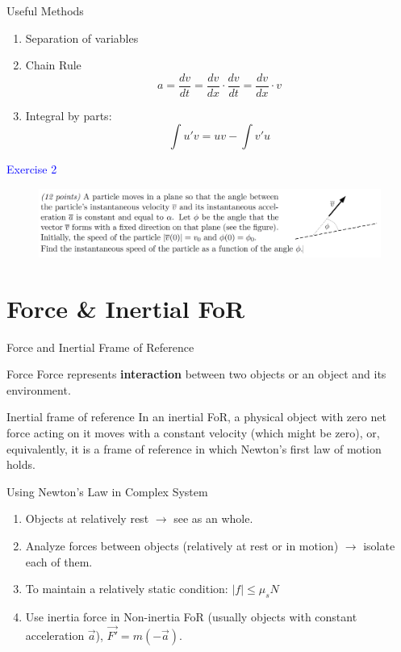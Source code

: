 \documentclass{beamer}
\begin{document}
\begin{frame}{Useful Methods}
  \begin{enumerate}
    \item Separation of variables\pause
    \item Chain Rule
    $$a = \frac{dv}{dt}=\frac{dv}{dx}\cdot \frac{dv}{dt}=\frac{dv}{dx}\cdot v$$\pause
    \item Integral by parts:
    $$\int u'v = uv - \int v'u$$
  \end{enumerate}
\end{frame}
\begin{frame}
\textcolor{blue}{Exercise 2}

\begin{figure}[htbp]
\centering
\includegraphics[width=1 \linewidth, angle =0]{ex1.png}
\label{fig:2}
\end{figure}
\end{frame}

\section{Force \& Inertial FoR}
\begin{frame}{Force and Inertial Frame of Reference}
  \begin{block}{Force}
    Force represents \textbf{interaction} between two objects or an object and its environment. 
  \end{block}\pause
  \begin{block}{Inertial frame of reference}
    In an inertial FoR, a physical object with zero net force acting on it moves with a constant velocity (which might be zero), or, equivalently, it is a frame of reference in which Newton's first law of motion holds.
 \end{block}
\end{frame}

\begin{frame}{Using Newton's Law in Complex System}
  \begin{enumerate}
    \item Objects at relatively rest $\rightarrow$ see as an whole.\pause
    \item Analyze forces between objects (relatively at rest or in motion) $\rightarrow$ isolate each of them.\pause
    \item To maintain a relatively static condition: $|f|\leq \mu_s N$\pause
    \item Use inertia force in Non-inertia FoR (usually objects with constant acceleration $\vec{a}$), $ \vec{F'} = m(-\vec{a})$.  
  \end{enumerate}
\end{frame}
\end{document}
